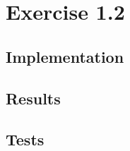 \section{Exercise 1.2}

\subsection{Implementation}
\newpage

\subsection{Results}
\newpage

\subsection{Tests}
\newpage
